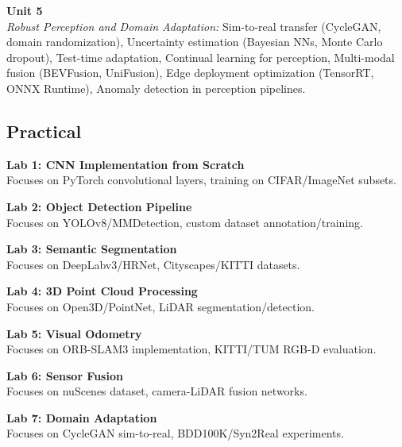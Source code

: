 \vspace{0.3cm}

\noindent\textbf{Unit 5} \\
\textit{Robust Perception and Domain Adaptation:} Sim-to-real transfer (CycleGAN, domain randomization), Uncertainty estimation (Bayesian NNs, Monte Carlo dropout), Test-time adaptation, Continual learning for perception, Multi-modal fusion (BEVFusion, UniFusion), Edge deployment optimization (TensorRT, ONNX Runtime), Anomaly detection in perception pipelines.

\newpage

\subsection*{Practical}
\noindent\textbf{Lab 1: CNN Implementation from Scratch} \\
Focuses on PyTorch convolutional layers, training on CIFAR/ImageNet subsets.

\vspace{0.2cm}

\noindent\textbf{Lab 2: Object Detection Pipeline} \\
Focuses on YOLOv8/MMDetection, custom dataset annotation/training.

\vspace{0.2cm}

\noindent\textbf{Lab 3: Semantic Segmentation} \\
Focuses on DeepLabv3/HRNet, Cityscapes/KITTI datasets.

\vspace{0.2cm}

\noindent\textbf{Lab 4: 3D Point Cloud Processing} \\
Focuses on Open3D/PointNet, LiDAR segmentation/detection.

\vspace{0.2cm}

\noindent\textbf{Lab 5: Visual Odometry} \\
Focuses on ORB-SLAM3 implementation, KITTI/TUM RGB-D evaluation.

\vspace{0.2cm}

\noindent\textbf{Lab 6: Sensor Fusion} \\
Focuses on nuScenes dataset, camera-LiDAR fusion networks.

\vspace{0.2cm}

\noindent\textbf{Lab 7: Domain Adaptation} \\
Focuses on CycleGAN sim-to-real, BDD100K/Syn2Real experiments.

